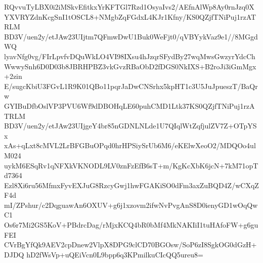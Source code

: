 RQvvuTyLBX0i2iMSkvEfitkxYrKFTGl7Rzd1OsyaIvs2/AEfnAlWp8Ay0rnJzq0X
YXVRYZdnKcgSnI1tOSCL8+NMgbZqFGdxL4KJr1Kfny/KS0QZjfTNiPuj1rzATRLM
BD3V/uen2y/etJAw23UIjtm7QFmwDwU1Buk0WeFjt0/qVBYykVaz9e1//8MGgdWQ
lyavNfg0vg/FIrLpvfvDQuWkLO4VI98IXsu4hJzqrSFydBy27wqMwsGwzyrYdcCh
WwwySnh6D0D03b8JBRHPBZ3vkGvzRBaObD2fDGS0NkIXS+B2roJi3iGmMgx+2zin
E/sugcKbiU3FGvL1R9K01QBo11pqrJaDwCNSrhx5kpHT1c3U5JuJpueszT/BaQrw
GYIBuDfbOslVP3PVU6Wf9dDBOHqLE60puhCMD1Ltk37KS0QZjfTNiPuj1rzATRLM
BD3V/uen2y/etJAw23UIjgeY4br85nGDNLNLde1U7QIqlWtZqfjulZV7Z+OTpYSx
xAs+qLxt8cMVL2LrBFGBuOPqd0hrHPSiySrUb6M6/eKElwXeoO2/MDQOo4ulM024
uykM6ESqRv1qNFXkVKNODL9LV0znFzEfB6sT+m/KgKcXbK6jcN+7kM71opTd7364
Ezl8Xi6ru56MfmxFyvEXJuG8RzcyGwj1hwFGAKiSO0dFm3axZuBQD4Z/wCXqZF4d
mI/ZPshur/c2DqguawAn6OXUV+g6j1xzovm2ifwNvPvgAnS8D0ienyGD1wOqQwC1
Os6r7Mi2GS5KoV+PBdrcDag/rMjxKCQ4bR0bMf4MkNAKIiI1tuHAfoFW+g6guFEI
CVrBgYfQk9AEV2cpDnew2VlpX8DPG9clCD70BGOsw/SoP6zI8SgkOG0dGzH+DJDQ
hD2fWsVp+uQEiVcn0L9bpp6q3KPmilkuCIcQQ5ureu8=
